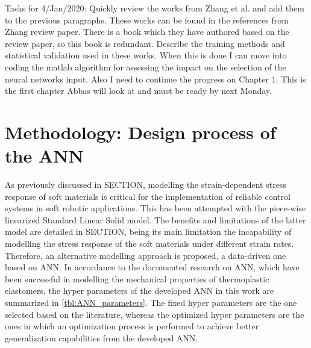 Tasks for 4/Jan/2020: Quickly review the works from Zhang et al. and add them to the previous paragraphs. These works can be found in the references from Zhang review paper. There is a book which they have authored based on the review paper, so this book is redundant. Describe the training methods and statistical validation used in these works. When this is done I can move into coding the matlab algorithm for assessing the impact on the selection of the neural networks input. Also I need to continue the progress on Chapter 1. This is the first chapter Abbas will look at and must be ready by next Monday.

\section{Methodology: Design process of the ANN}

As previously discussed in SECTION, modelling the strain-dependent stress response of soft materials is critical for the implementation of reliable control systems in soft robotic applications. This has been attempted with the piece-wise linearized Standard Linear Solid model. The benefits and limitations of the latter model are detailed in SECTION, being its main limitation the incapability of modelling the stress response of the soft materials under different strain rates. Therefore, an alternative modelling approach is proposed, a data-driven one based on ANN. In accordance to the documented research on ANN, which have been successful in modelling the mechanical properties of thermoplastic elastomers, the hyper parameters of the developed ANN in this work are summarized in \autoref{tbl:ANN_parameters}. The fixed hyper parameters are the one selected based on the literature, whereas the optimized hyper parameters are the ones in which an optimization process is performed to achieve better generalization capabilities from the developed ANN. 

